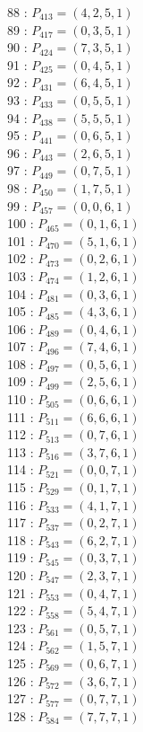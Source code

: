 \documentclass{article}
\begin{document}
{\begin{multicols}{3}
88 : $P_{413}=( 4, 2, 5, 1 )$\\
89 : $P_{417}=( 0, 3, 5, 1 )$\\
90 : $P_{424}=( 7, 3, 5, 1 )$\\
91 : $P_{425}=( 0, 4, 5, 1 )$\\
92 : $P_{431}=( 6, 4, 5, 1 )$\\
93 : $P_{433}=( 0, 5, 5, 1 )$\\
94 : $P_{438}=( 5, 5, 5, 1 )$\\
95 : $P_{441}=( 0, 6, 5, 1 )$\\
96 : $P_{443}=( 2, 6, 5, 1 )$\\
97 : $P_{449}=( 0, 7, 5, 1 )$\\
98 : $P_{450}=( 1, 7, 5, 1 )$\\
99 : $P_{457}=( 0, 0, 6, 1 )$\\
100 : $P_{465}=( 0, 1, 6, 1 )$\\
101 : $P_{470}=( 5, 1, 6, 1 )$\\
102 : $P_{473}=( 0, 2, 6, 1 )$\\
103 : $P_{474}=( 1, 2, 6, 1 )$\\
104 : $P_{481}=( 0, 3, 6, 1 )$\\
105 : $P_{485}=( 4, 3, 6, 1 )$\\
106 : $P_{489}=( 0, 4, 6, 1 )$\\
107 : $P_{496}=( 7, 4, 6, 1 )$\\
108 : $P_{497}=( 0, 5, 6, 1 )$\\
109 : $P_{499}=( 2, 5, 6, 1 )$\\
110 : $P_{505}=( 0, 6, 6, 1 )$\\
111 : $P_{511}=( 6, 6, 6, 1 )$\\
112 : $P_{513}=( 0, 7, 6, 1 )$\\
113 : $P_{516}=( 3, 7, 6, 1 )$\\
114 : $P_{521}=( 0, 0, 7, 1 )$\\
115 : $P_{529}=( 0, 1, 7, 1 )$\\
116 : $P_{533}=( 4, 1, 7, 1 )$\\
117 : $P_{537}=( 0, 2, 7, 1 )$\\
118 : $P_{543}=( 6, 2, 7, 1 )$\\
119 : $P_{545}=( 0, 3, 7, 1 )$\\
120 : $P_{547}=( 2, 3, 7, 1 )$\\
121 : $P_{553}=( 0, 4, 7, 1 )$\\
122 : $P_{558}=( 5, 4, 7, 1 )$\\
123 : $P_{561}=( 0, 5, 7, 1 )$\\
124 : $P_{562}=( 1, 5, 7, 1 )$\\
125 : $P_{569}=( 0, 6, 7, 1 )$\\
126 : $P_{572}=( 3, 6, 7, 1 )$\\
127 : $P_{577}=( 0, 7, 7, 1 )$\\
128 : $P_{584}=( 7, 7, 7, 1 )$\\
\end{multicols}


}
\end{document}

